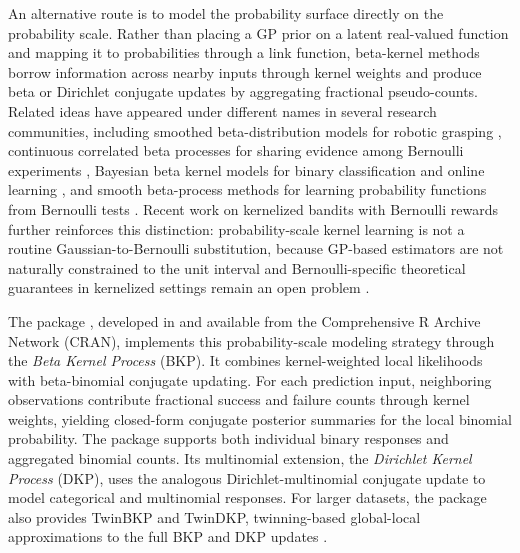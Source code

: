 \documentclass[article, shortnames]{jss}
\begin{document}
An alternative route is to model the probability surface directly on the probability scale. Rather than placing a GP prior on a latent real-valued function and mapping it to probabilities through a link function, beta-kernel methods borrow information across nearby inputs through kernel weights and produce beta or Dirichlet conjugate updates by aggregating fractional pseudo-counts. Related ideas have appeared under different names in several research communities, including smoothed beta-distribution models for robotic grasping \citep{Montesano2009, Montesano2012}, continuous correlated beta processes for sharing evidence among Bernoulli experiments \citep{Goetschalckx:2011}, Bayesian beta kernel models for binary classification and online learning \citep{MacKenzie2014}, and smooth beta-process methods for learning probability functions from Bernoulli tests \citep{Rolland2019BKP}. Recent work on kernelized bandits with Bernoulli rewards further reinforces this distinction: probability-scale kernel learning is not a routine Gaussian-to-Bernoulli substitution, because GP-based estimators are not naturally constrained to the unit interval and Bernoulli-specific theoretical guarantees in kernelized settings remain an open problem \citep{Mussi2024KMAB}.

The  package \citep{Zhao2026BKP}, developed in  \citep{R} and available from the Comprehensive R Archive Network (CRAN), implements this probability-scale modeling strategy through the \emph{Beta Kernel Process} (BKP). It combines kernel-weighted local likelihoods with beta-binomial conjugate updating. For each prediction input, neighboring observations contribute fractional success and failure counts through kernel weights, yielding closed-form conjugate posterior summaries for the local binomial probability. The package supports both individual binary responses and aggregated binomial counts. Its multinomial extension, the \emph{Dirichlet Kernel Process} (DKP), uses the analogous Dirichlet-multinomial conjugate update to model categorical and multinomial responses. 
For larger datasets, the package also provides TwinBKP and TwinDKP, twinning-based global-local approximations to the full BKP and DKP updates \citep{Vakayil2022Twinning,Vakayil2024TwinGP}.
\end{document}

